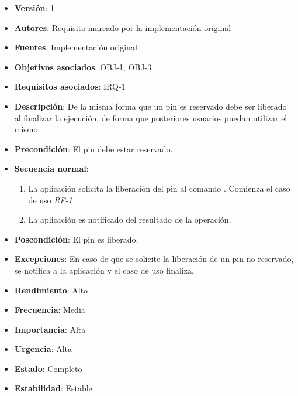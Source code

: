 \documentclass[letterpaper,10pt,spanish]{sphinxmanual}
\begin{document}
\label{analysis/fr:rf-3-liberacion-de-un-pin}\begin{itemize}
\item {} 
\textbf{Versión}: 1

\item {} 
\textbf{Autores}: Requisito marcado por la implementación original

\item {} 
\textbf{Fuentes}: Implementación original

\item {} 
\textbf{Objetivos asociados}: OBJ-1, OBJ-3

\item {} 
\textbf{Requisitos asociados}: IRQ-1

\item {} 
\textbf{Descripción}: De la misma forma que un pin es reservado debe ser liberado al finalizar la ejecución, de forma que posteriores usuarios puedan utilizar el mismo.

\item {} 
\textbf{Precondición}: El pin debe estar reservado.

\item {} 
\textbf{Secuencia normal}:
\begin{enumerate}
\item {} 
La aplicación solicita la liberación del pin al comando . Comienza el caso de uso \emph{RF-1}

\item {} 
La aplicación es notificado del resultado de la operación.

\end{enumerate}

\item {} 
\textbf{Poscondición}: El pin es liberado.

\item {} 
\textbf{Excepciones}: En caso de que se solicite la liberación de un pin no reservado, se notifica a la aplicación y el caso de uso finaliza.

\item {} 
\textbf{Rendimiento}: Alto

\item {} 
\textbf{Frecuencia}: Media

\item {} 
\textbf{Importancia}: Alta

\item {} 
\textbf{Urgencia}: Alta

\item {} 
\textbf{Estado}: Completo

\item {} 
\textbf{Estabilidad}: Estable

\end{itemize}
\end{document}
